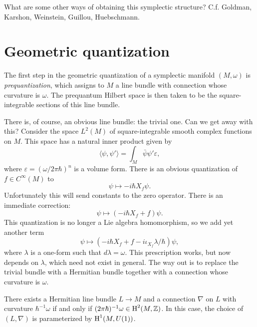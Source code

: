 \documentclass{amsart}
\begin{document}
{\color{red} What are some other ways of obtaining this symplectic structure? C.f. Goldman, Karshon, Weinstein,
Guillou, Huebschmann.}

\section{Geometric quantization}

The first step in the geometric quantization of a symplectic manifold $(M,\omega)$ is \textit{prequantization},
which assigns to $M$ a line bundle with connection whose curvature is $\omega$. The prequantum Hilbert
space is then taken to be the square-integrable sections of this line bundle.

There is, of course, an obvious line bundle: the trivial one. Can we get away with this?
Consider the space $L^2(M)$ of
square-integrable smooth complex functions on $M$. This space has a natural inner product given by
\begin{equation*}
    \langle\psi,\psi'\rangle = \int_M \bar\psi \psi' \varepsilon,
\end{equation*}
where $\varepsilon=(\omega/2\pi\hbar)^n$ is a volume form. There is an obvious quantization of
$f\in C^\infty(M)$ to
\begin{equation*}
    \psi \mapsto -i\hbar X_f\psi.
\end{equation*}
Unfortunately this will send constants to the zero operator. There is an immediate correction:
\begin{equation*}
    \psi \mapsto (-i\hbar X_f + f)\psi.
\end{equation*}
This quantization is no longer a Lie algebra homomorphism, so we add yet another term
\begin{equation*}
    \psi \mapsto (-i\hbar X_f + f -i\iota_{X_f}\lambda/\hbar)\psi,
\end{equation*}
where $\lambda$ is a one-form such that $d\lambda=\omega$. This prescription works, but now
depends on $\lambda$, which need not exist in general. The way out is to replace the
trivial bundle with a Hermitian bundle together with a connection whose curvature is $\omega$.

\begin{theorem}
    There exists a Hermitian line bundle $L\to M$ and a connection $\nabla$ on $L$ with
    curvature $\hbar^{-1}\omega$ if and only if $(2\pi\hbar)^{-1}\omega\in \operatorname{H}^2(M,\mathbb{Z})$.
    In this case, the choice of $(L,\nabla)$ is parameterized by $\operatorname{H}^1(M,U(1))$.
\end{theorem}
\end{document}
